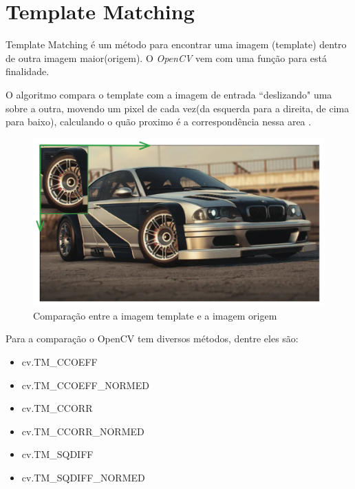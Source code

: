 \documentclass[article,
12pt,
a4paper,
openany,
oneside,
brazil,
]{abntex2}
\begin{document}
  \maketitle

  \textual


  \section{Template Matching}
    Template Matching é um método para encontrar uma imagem (template) dentro de outra imagem maior(origem). O \textit{OpenCV} vem com uma função  para está finalidade.

    O algoritmo compara o template com a imagem de entrada ``deslizando" uma sobre a outra, movendo um pixel de cada vez(da esquerda para a direita, de cima para baixo), calculando o quão proximo é a correspondência nessa area \cite{ana}.

    \begin{figure}[!htbp]
      \center
      \includegraphics[scale=0.4]{compara.png}
      \caption{Comparação entre a imagem template e a imagem origem}
    \end{figure}

    \newpage
    Para a comparação o OpenCV tem diversos métodos, dentre eles são:
    \begin{itemize}
      \item cv.TM\_CCOEFF 
      \item cv.TM\_CCOEFF\_NORMED 
      \item cv.TM\_CCORR
      \item cv.TM\_CCORR\_NORMED
      \item cv.TM\_SQDIFF
      \item cv.TM\_SQDIFF\_NORMED
    \end{itemize} 
\end{document}
